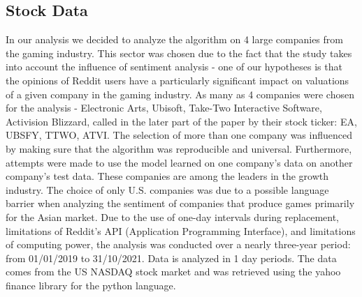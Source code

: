 \documentclass[11pt]{article} %
\begin{document}
\subsection{Stock Data}
In our analysis we decided to analyze the algorithm on 4 large companies from the gaming industry. This sector was chosen due to the fact that the study takes into account the influence of sentiment analysis - one of our hypotheses is that the opinions of Reddit users have a particularly significant impact on valuations of a given company in the gaming industry. As many as 4 companies were chosen for the analysis - Electronic Arts, Ubisoft, Take-Two Interactive Software, Activision Blizzard, called in the later part of the paper by their stock ticker: EA, UBSFY, TTWO, ATVI.  The selection of more than one company was influenced by making sure that the algorithm was reproducible and universal. Furthermore, attempts were made to use the model learned on one company's data on another company's test data. These companies are among the leaders in the growth industry. The choice of only U.S. companies was due to a possible language barrier when analyzing the sentiment of companies that produce games primarily for the Asian market. Due to the use of one-day intervals during replacement, limitations of Reddit's API (Application Programming Interface), and limitations of computing power, the analysis was conducted over a nearly three-year period: from 01/01/2019 to 31/10/2021. Data is analyzed in 1 day periods. The data comes from the US NASDAQ stock market and was retrieved using the yahoo finance library for the python language. 
\end{document}
